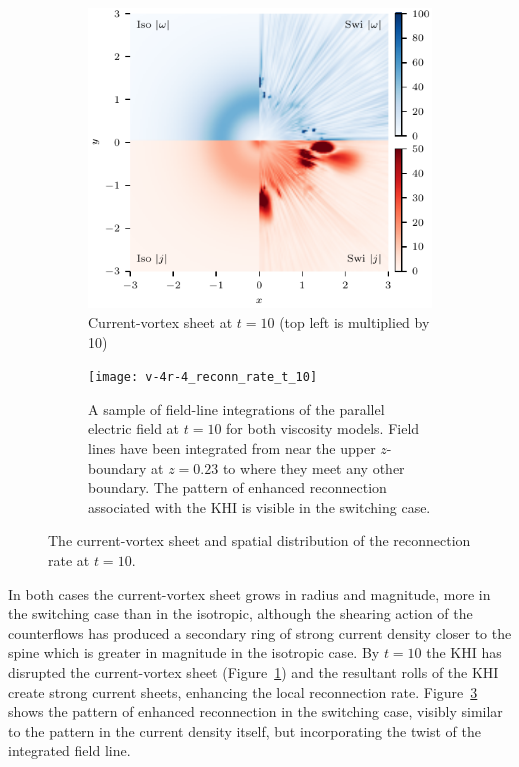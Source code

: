 \begin{figure}[t]
  \centering
    \begin{subfigure}{0.48\textwidth}
      \includegraphics[width=\linewidth]{v-4r-4_vorticity_current_ring_t_10}
      \caption{Current-vortex sheet at $t=10$ (top left is multiplied by 10)}
      \label{fig:v-4r-4_vorticity_current_ring_t_10}
    \end{subfigure}
    \hfill
    \begin{subfigure}{0.48\textwidth}
      \texttt{[image: v-4r-4\_reconn\_rate\_t\_10]}
      \caption{A sample of field-line integrations of the parallel electric field at $t=10$ for both viscosity models. Field lines have been integrated from near the upper $z$-boundary at $z=0.23$ to where they meet any other boundary. The pattern of enhanced reconnection associated with the KHI is visible in the switching case.}
      \label{fig:v-4r-4_reconn_rate_t_10}
    \end{subfigure}
\caption{The current-vortex sheet and spatial distribution of the reconnection rate at $t=10$.}
\end{figure}

In both cases the current-vortex sheet grows in radius and magnitude, more in the switching case than in the isotropic, although the shearing action of the counterflows has produced a secondary ring of strong current density closer to the spine which is greater in magnitude in the isotropic case. By $t=10$ the KHI has disrupted the current-vortex sheet (Figure~\ref{fig:v-4r-4_vorticity_current_ring_t_10}) and the resultant rolls of the KHI create strong current sheets, enhancing the local reconnection rate. Figure~\ref{fig:v-4r-4_reconn_rate_t_10} shows the pattern of enhanced reconnection in the switching case, visibly similar to the pattern in the current density itself, but incorporating the twist of the integrated field line.

